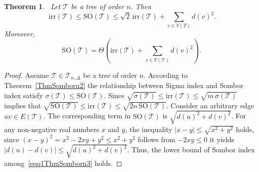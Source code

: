 \documentclass[12pt, a4paper]{article}
\newtheorem{theorem}{Theorem}[section]
\newcommand{\TT}{\mathcal{T}}
\newcommand{\irr}{\mathrm{irr}}
\newcommand{\SO}{\mathrm{SO}}
\begin{document}
\begin{theorem}~\label{ThmSomborn3}
Let $\TT$ be a tree of order $n$. Then
\begin{equation}~\label{eqq1ThmSomborn3}
\irr(\TT)\leqslant \SO(\TT)\leqslant\sqrt{2}\,\irr(\TT)+\sum_{v \in V(T)} d(v)^2.
\end{equation}
Moreover,
\[
\SO(\TT)=\Theta\!\left(\irr(\TT)+\sum_{v\in V(\TT)} d(v)^2\right).
\]
\end{theorem}
\begin{proof}
Assume $\TT\in \mathcal{T}_{n,\Delta}$ be a tree of order $n$. According to Theorem~\ref{ThmSomborn2} the relationship between Sigma index and Sombor index satisfy $\sigma(\TT)\leqslant \SO(\TT)$. Since $\sqrt{\sigma(\TT)}\leqslant \irr(\TT)\leqslant \sqrt{m\,\sigma(\TT)}$ implies that $\sqrt{\SO(\TT)}\leqslant \irr(\TT)\leqslant \sqrt{2n\,\SO(\TT)}$. Consider an arbitrary edge $uv \in E(\TT)$. The corresponding term in $\SO(\TT)$ is $\sqrt{d(u)^2+d(v)^2}$. For any non-negative real numbers $x$ and $y$, the inequality $|x-y|\leqslant \sqrt{x^2+y^2}$ holds, since $(x-y)^2=x^2-2xy+y^2\leqslant x^2+y^2$ follows from $-2xy\leqslant 0$ it yields $|d(u)-d(v)|\leqslant \sqrt{d(u)^2+d(v)^2}$. Thus, the lower bound of Sombor index among~\eqref{eqq1ThmSomborn3} holds.


\end{proof}
\end{document}
